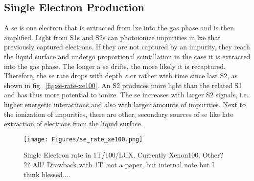 
\FloatBarrier
\subsection{Single Electron Production}
\label{ssec:se-source}
\FloatBarrier


A \gls{se} is one electron that is extracted from \gls{lxe} into the gas phase and is then amplified.
Light from S1s and S2s can photoionize impurities in \gls{lxe} that previously captured electrons.
If they are not captured by an impurity, they reach the liquid surface and undergo proportional scintillation in the case it is extracted into the gas phase.
The longer a \gls{se} drifts, the more likely it is recaptured.
Therefore, the \gls{se} rate drops with depth $ z $ or rather with time since last S2, as shown in fig.~\ref{fig:se-rate-xe100}.  %
An S2 produces more light than the related S1 and has thus more potential to ionize.
The \gls{se} increases with larger S2 signals, i.e. higher energetic interactions and also with larger amounts of impurities\cite{}.  %
Next to the ionization of impurities, there are other, secondary sources of \gls{se} like late extraction of electrons from the liquid surface.


\begin{figure}
    \centering
    \texttt{[image: Figures/se\_rate\_xe100.png]}  %
    \caption[Single Electron Rate in 1T/100/LUX]{
        Single Electron rate in 1T/100/LUX. Currently Xenon100. Other? 2? All? Drawback with 1T: not a paper, but internal note but I think blessed...\cite{Aprile2014}.
    }
    \label{fig:se-rate}
\end{figure}




